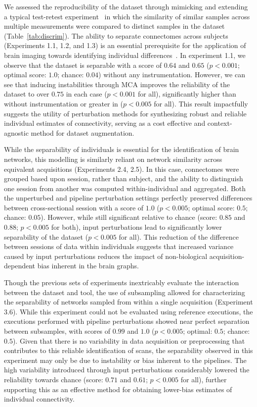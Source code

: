 \documentclass[fleqn,10pt]{SelfArx} %
\begin{document}
We assessed the reproducibility of the dataset through mimicking and extending a typical test-retest
experiment~\cite{bridgeford2020elim} in which the similarity of similar samples across multiple measurements were
compared to distinct samples in the dataset (Table~\ref{tab:discrim}). The ability to separate connectomes across
subjects (Experiments 1.1, 1.2, and 1.3) is an essential prerequisite for the application of brain imaging towards
identifying individual differences~\cite{Dubois2016-yr}. In experiment 1.1, we observe that the dataset is separable
with a score of $0.64$ and $0.65$ ($p < 0.001$; optimal score: $1.0$; chance: $0.04$) without any instrumentation.
However, we can see that inducing instabilities through MCA improves the reliability of the dataset to over $0.75$ in
each case ($p < 0.001$ for all), significantly higher than without instrumentation or greater in ($p < 0.005$ for all).
This result impactfully suggests the utility of perturbation methods for synthesizing robust and reliable individual
estimates of connectivity, serving as a cost effective and context-agnostic method for dataset augmentation.

While the separability of individuals is essential for the identification of brain networks, this modelling is
similarly reliant on network similarity across equivalent acquisitions (Experiments 2.4, 2.5). In this case,
connectomes were grouped based upon session, rather than subject, and the ability to distinguish one session from
another was computed within-individual and aggregated. Both the unperturbed and pipeline perturbation settings
perfectly preserved differences between cross-sectional session with a score of $1.0$ ($p < 0.005$; optimal score:
$0.5$; chance: $0.05$). However, while still significant relative to chance (score: $0.85$ and $0.88$; $p < 0.005$ for
both), input perturbations lead to significantly lower separability of the dataset ($p < 0.005$ for all). This
reduction of the difference between sessions of data within individuals suggests that increased variance caused by
input perturbations reduces the impact of non-biological acquisition-dependent bias inherent in the brain graphs.

Though the previous sets of experiments inextricably evaluate the interaction between the dataset and tool, the use of
subsampling allowed for characterizing the separability of networks sampled from within a single acquisition
(Experiment 3.6). While this experiment could not be evaluated using reference executions, the executions performed
with pipeline perturbations showed near perfect separation between subsamples, with scores of $0.99$ and $1.0$
($p < 0.005$; optimal: $0.5$; chance: $0.5$). Given that there is no variability in data acquisition or preprocessing
that contributes to this reliable identification of scans, the separability observed in this experiment may only be due
to instability or bias inherent to the pipelines. The high variability introduced through input perturbations
considerably lowered the reliability towards chance (score: $0.71$ and $0.61$; $p < 0.005$ for all), further supporting
this as an effective method for obtaining lower-bias estimates of individual connectivity.
\end{document}
